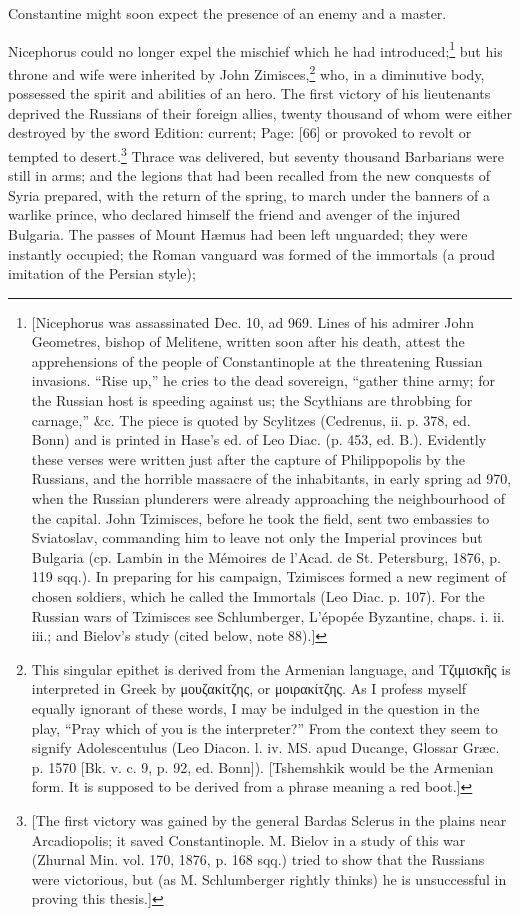 Constantine might soon expect the presence of an enemy and a master.

Nicephorus could no longer expel the mischief which he had introduced;\footnote{[Nicephorus was assassinated Dec. 10, ad 969. Lines of his admirer John Geometres, bishop of Melitene, written soon after his death, attest the apprehensions of the people of Constantinople at the threatening Russian invasions. \texthebrew{“}Rise up,\texthebrew{}” he cries to the dead sovereign, \texthebrew{“}gather thine army; for the Russian host is speeding against us; the Scythians are throbbing for carnage,\texthebrew{}” \&c. The piece is quoted by Scylitzes (Cedrenus, ii. p. 378, ed. Bonn) and is printed in Hase\texthebrew{}’s ed. of Leo Diac. (p. 453, ed. B.). Evidently these verses were written just after the capture of Philippopolis by the Russians, and the horrible massacre of the inhabitants, in early spring ad 970, when the Russian plunderers were already approaching the neighbourhood of the capital. John Tzimisces, before he took the field, sent two embassies to Sviatoslav, commanding him to leave not only the Imperial provinces but Bulgaria (cp. Lambin in the Mémoires de l\texthebrew{}’Acad. de St. Petersburg, 1876, p. 119 sqq.). In preparing for his campaign, Tzimisces formed a new regiment of chosen soldiers, which he called the Immortals (Leo Diac. p. 107). For the Russian wars of Tzimisces see Schlumberger, L\texthebrew{}’épopée Byzantine, chaps. i. ii. iii.; and Bielov\texthebrew{}’s study (cited below, note 88).]} but his throne and wife were inherited by John Zimisces,\footnote{This singular epithet is derived from the Armenian language, and \textgreek{Τζιμισκ\texthebrew{ῆ}ς} is interpreted in Greek by \textgreek{μουζακίτζης}, or \textgreek{μοιρακίτζης}. As I profess myself equally ignorant of these words, I may be indulged in the question in the play, \texthebrew{“}Pray which of you is the interpreter?\texthebrew{}” From the context they seem to signify Adolescentulus (Leo Diacon. l. iv. MS. apud Ducange, Glossar Græc. p. 1570 [Bk. v. c. 9, p. 92, ed. Bonn]). [Tshemshkik would be the Armenian form. It is supposed to be derived from a phrase meaning a red boot.]} who, in a diminutive body, possessed the spirit and abilities of an hero. The first victory of his lieutenants deprived the Russians of their foreign allies, twenty thousand of whom were either destroyed by the sword Edition: current; Page: [66] or provoked to revolt or tempted to desert.\footnote{[The first victory was gained by the general Bardas Sclerus in the plains near Arcadiopolis; it saved Constantinople. M. Bielov in a study of this war (Zhurnal Min. vol. 170, 1876, p. 168 sqq.) tried to show that the Russians were victorious, but (as M. Schlumberger rightly thinks) he is unsuccessful in proving this thesis.]} Thrace was delivered, but seventy thousand Barbarians were still in arms; and the legions that had been recalled from the new conquests of Syria prepared, with the return of the spring, to march under the banners of a warlike prince, who declared himself the friend and avenger of the injured Bulgaria. The passes of Mount Hæmus had been left unguarded; they were instantly occupied; the Roman vanguard was formed of the immortals (a proud imitation of the Persian style); 